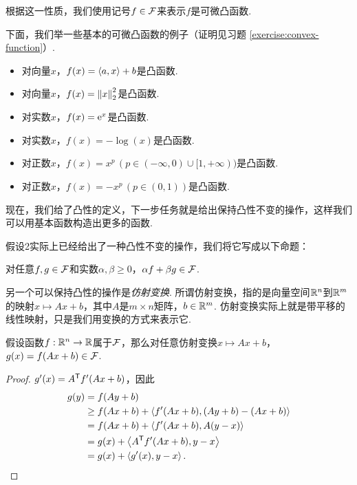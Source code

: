 根据这一性质，我们使用记号$f\in\mathcal F$来表示$f$是可微凸函数.

下面，我们举一些基本的可微凸函数的例子（证明见习题 \ref{exercise:convex-function}）.

\begin{example}\label{example:convex-function}
    \begin{itemize}
        \item 对向量$x$，$f(x)=\left\langle{a},{x}\right\rangle+b$是凸函数.
        \item 对向量$x$，$f(x)=\left\|x\right\|_2^2$是凸函数.
        \item 对实数$x$，$f(x)=\mathrm{e}^x$是凸函数.
        \item 对实数$x$，$f(x)=-\log(x)$是凸函数.
        \item 对正数$x$，$f(x)=x^p\,(p\in(-\infty,0)\cup[1,+\infty))$是凸函数.
        \item 对正数$x$，$f(x)=-x^p\,(p\in(0,1))$是凸函数.
    \end{itemize}
\end{example}

现在，我们给了凸性的定义，下一步任务就是给出保持凸性不变的操作，这样我们可以用基本函数构造出更多的函数. 

假设2实际上已经给出了一种凸性不变的操作，我们将它写成以下命题：
\begin{proposition}\label{proposition:nonnegative-combination}
    对任意$f,g\in\mathcal F$和实数$\alpha,\beta\geq 0$，$\alpha f+\beta g\in\mathcal F$.
\end{proposition}

另一个可以保持凸性的操作是\textit{仿射变换}. 所谓仿射变换，指的是向量空间$\mathbb{R}^n$到$\mathbb{R}^m$的映射$x\mapsto Ax+b$，其中$A$是$m\times n$矩阵，$b\in\mathbb{R}^m$. 仿射变换实际上就是带平移的线性映射，只是我们用变换的方式来表示它. 

\begin{proposition}\label{proposition:affine-transformation}
假设函数$f:\mathbb{R}^n\to\mathbb{R}$属于$\mathcal F$，那么对任意仿射变换$x\mapsto Ax+b$，$g(x)=f(Ax+b)\in\mathcal F$.
\end{proposition}
\begin{proof}
    $g'(x)=A^{\mathsf{T}} f'(Ax+b)$，因此
    \begin{align*}
        g(y)&=f(Ay+b)\\
        &\geq f(Ax+b)+\left\langle{f'(Ax+b)},{(Ay+b)-(Ax+b)}\right\rangle\\
        &=f(Ax+b)+\left\langle{f'(Ax+b)},{A(y-x)}\right\rangle\\
        &=g(x)+\left\langle{A^{\mathsf{T}}f'(Ax+b)},{y-x}\right\rangle\\
        &=g(x)+\left\langle{g'(x)},{y-x}\right\rangle.
    \end{align*}
\end{proof}

